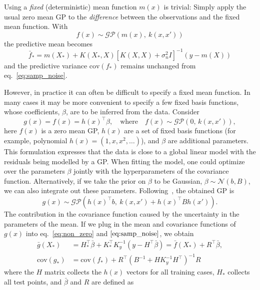 \documentclass{article}[12pt]
\newcommand{\cov}{\mathrm{cov}}
\begin{document}
Using a \textit{fixed} (deterministic) mean function $m(x)$ is trivial: Simply apply
the usual zero mean GP to the \textit{difference} between the observations and the
fixed mean function. With
\begin{equation}
f(x)\sim \mathcal{GP}(m(x),\ k(x,x')) 
\end{equation}
the predictive mean becomes
\begin{equation}
\bar{f}_* = m(X_*) + K(X_*,X)\left[K(X,X)+\sigma_n^2 I\right]^{-1} (y-m(X))
\end{equation}
and the predictive variance $\cov(f_*)$ remains unchanged from
eq.~\eqref{eq:samp_noise}.

However, in practice it can often be difficult to specify a fixed mean function.
In many cases it may be more convenient to specify a few fixed basis functions,
whose coefficients, $\beta$, are to be inferred from the data. Consider
\begin{equation}
\label{eq:non_zero}
g(x) = f(x) = h(x)^\top \beta,\quad\text{where}\quad
f(x)\sim\mathcal{GP}(0,\,k(x,x')),
\end{equation}
here $f(x)$ is a zero mean GP, $h(x)$ are a set of fixed basis functions (for example, polynomial $h(x)=(1,x,x^2,\ldots)$), and $\beta$ are
additional parameters. This formulation expresses that the data is close to a
global linear model with the residuals being modelled by a GP.
When fitting the model, one could optimize over the parameters $\beta$ jointly with
the hyperparameters of the covariance function. Alternatively, if we take the prior on $\beta$ to be Gaussian, $\beta\sim\mathcal{N}(b,B)$, we can also integrate out these
parameters. Following~\cite{o1978curve}, the obtained GP is
\begin{equation}
g(x) \sim\mathcal{GP}(h(x)^\top b,\ 
k(x,x')+h(x)^\top Bh(x')).
\end{equation}
The contribution in the covariance function caused by the uncertainty in the parameters of the mean.
If we plug in the mean and covariance functions of $g(x)$ into eq.~\eqref{eq:non_zero} and
$\eqref{eq:samp_noise}$, we obtain
\begin{align}
\bar{g}(X_*) &= H_*^\top \bar{\beta}+
K_*^\top K_y^{-1}(y-H^\top \bar{\beta})=
\bar{f}(X_*)+R^\top \bar{\beta},\label{eq:non-zero_mean}\\
\cov(g_*) &= \cov(f_*) + R^\top (B^{-1} + H K_y^{-1}H^\top)^{-1} R\label{eq:non-zero_cov}
\end{align}
where the $H$ matrix collects the $h(x)$ vectors for all training cases, $H_*$ collects all test points, and $\bar{\beta}$ and $R$ are defined as
\end{document}
